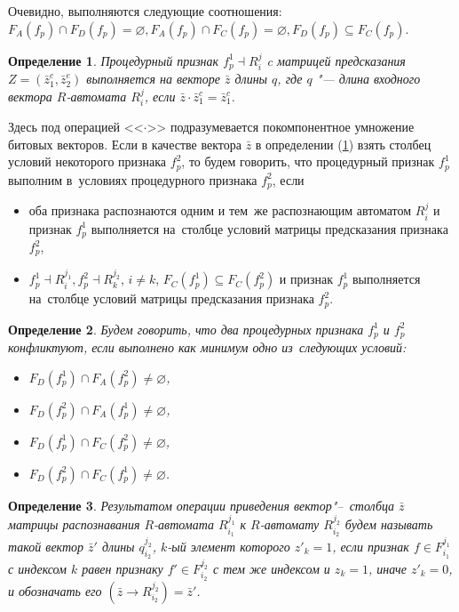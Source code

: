 \documentclass[a4paper, 12pt]{article}
\theoremstyle{plain}
\newtheorem{Def}{Определение}
\begin{document}
	Очевидно, выполняются следующие соотношения: $F_A(f_p)\cap F_D(f_p)=\varnothing, F_A(f_p)\cap F_C(f_p)=\varnothing, F_D(f_p)\subseteq F_C(f_p)$.

	\begin{Def}\label{def:feas}
		Процедурный признак $f_p^1\dashv R_i^j$ c матрицей предсказания $Z=(\bar z_1^c,\bar z_2^e)$ выполняется на векторе $\bar z$ длины $q$, где $q$ "--- длина входного вектора $R$-автомата $R_i^j$, если $\bar z\cdot \bar z_1^c=\bar z_1^c$.
	\end{Def}
	
	Здесь под операцией <<$\cdot$>> подразумевается покомпонентное умножение битовых векторов. Если в качестве вектора $\bar z$ в определении (\ref{def:feas}) взять столбец условий некоторого признака $f_p^2$, то будем говорить, что процедурный признак $f_p^1$ выполним в~условиях процедурного признака $f_p^2$, если 
	\begin{itemize}
		\item оба признака распознаются одним и тем~же распознающим автоматом $R_i^j$ и признак  $f_p^1$ выполняется на~столбце условий матрицы предсказания признака $f_p^2$,
		\item $f_p^1\dashv R_i^{j_1}, f_p^2\dashv R_k^{j_2}$, $i\not=k$, $F_C(f_p^1 )\subseteq F_C(f_p^2)$ и признак  $f_p^1$ выполняется на~столбце условий матрицы предсказания признака $f_p^2$. 
	\end{itemize}
	
	\begin{Def}
		Будем говорить, что два процедурных признака $f_p^1$ и $f_p^2$ конфликтуют, если выполнено как минимум одно из~следующих условий:
		\begin{itemize}
			\item $F_D(f_p^1)\cap F_A(f_p^2)\not=\varnothing$,
			\item $F_D(f_p^2)\cap F_A(f_p^1)\not=\varnothing$,
			\item $F_D(f_p^1)\cap F_C(f_p^2)\not=\varnothing$,
			\item $F_D(f_p^2)\cap F_C(f_p^1)\not=\varnothing$.
		\end{itemize}
	\end{Def}
	
	\begin{Def}
		Результатом операции приведения вектор"--~столбца $\bar z$ матрицы распознавания $R$-автомата $R_{i_1}^{j_1}$ к $R$-автомату $R_{i_2}^{j_2}$ будем называть такой вектор $\bar z'$ длины $q_{i_2}^{j_2}$, $k$-ый элемент которого $z'_k=1$, если признак $f\in F_{i_1}^{j_1}$ с индексом $k$ равен признаку $f'\in F_{i_2}^{j_2}$ с тем же индексом и $z_k=1$, иначе $z'_k=0$, и обозначать его $(\bar z\rightarrow R_{i_2}^{j_2})=\bar z'$.
	\end{Def}
	
\end{document}
